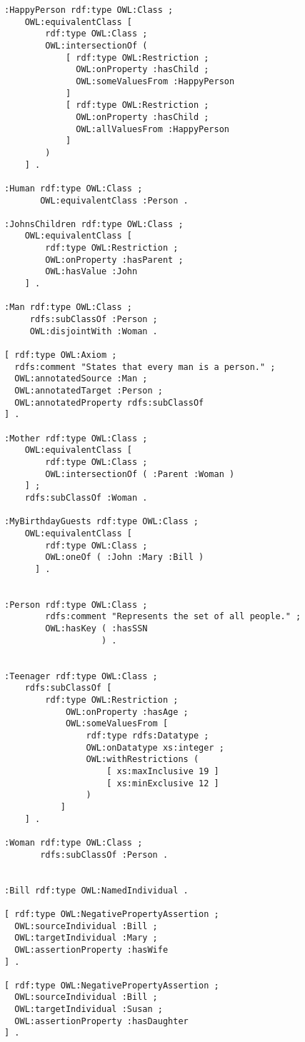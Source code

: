 \documentclass[11pt,a4paper,final,oneside,onecolumn]{article}
\begin{document}
\begin{lstlisting}[language=Turtle]
:HappyPerson rdf:type OWL:Class ;
    OWL:equivalentClass [ 
        rdf:type OWL:Class ;
        OWL:intersectionOf ( 
            [ rdf:type OWL:Restriction ;
              OWL:onProperty :hasChild ;
              OWL:someValuesFrom :HappyPerson
            ]
            [ rdf:type OWL:Restriction ;
              OWL:onProperty :hasChild ;
              OWL:allValuesFrom :HappyPerson
            ]
        )
    ] .

:Human rdf:type OWL:Class ;
       OWL:equivalentClass :Person .

:JohnsChildren rdf:type OWL:Class ;
    OWL:equivalentClass [ 
        rdf:type OWL:Restriction ;
        OWL:onProperty :hasParent ;
        OWL:hasValue :John
    ] .

:Man rdf:type OWL:Class ;
     rdfs:subClassOf :Person ;
     OWL:disjointWith :Woman .

[ rdf:type OWL:Axiom ;
  rdfs:comment "States that every man is a person." ;
  OWL:annotatedSource :Man ;
  OWL:annotatedTarget :Person ;
  OWL:annotatedProperty rdfs:subClassOf
] .

:Mother rdf:type OWL:Class ;
    OWL:equivalentClass [ 
        rdf:type OWL:Class ;
        OWL:intersectionOf ( :Parent :Woman )
    ] ;
    rdfs:subClassOf :Woman .

:MyBirthdayGuests rdf:type OWL:Class ;
    OWL:equivalentClass [ 
        rdf:type OWL:Class ;
        OWL:oneOf ( :John :Mary :Bill )
      ] .


:Person rdf:type OWL:Class ;
        rdfs:comment "Represents the set of all people." ;
        OWL:hasKey ( :hasSSN
                   ) .


:Teenager rdf:type OWL:Class ;
    rdfs:subClassOf [ 
        rdf:type OWL:Restriction ;
            OWL:onProperty :hasAge ;
            OWL:someValuesFrom [ 
                rdf:type rdfs:Datatype ;
                OWL:onDatatype xs:integer ;
                OWL:withRestrictions ( 
                    [ xs:maxInclusive 19 ]
                    [ xs:minExclusive 12 ]
                )
           ]    
    ] .

:Woman rdf:type OWL:Class ;
       rdfs:subClassOf :Person .


:Bill rdf:type OWL:NamedIndividual .

[ rdf:type OWL:NegativePropertyAssertion ;
  OWL:sourceIndividual :Bill ;
  OWL:targetIndividual :Mary ;
  OWL:assertionProperty :hasWife
] .

[ rdf:type OWL:NegativePropertyAssertion ;
  OWL:sourceIndividual :Bill ;
  OWL:targetIndividual :Susan ;
  OWL:assertionProperty :hasDaughter
] .


\end{lstlisting}
\end{document}

